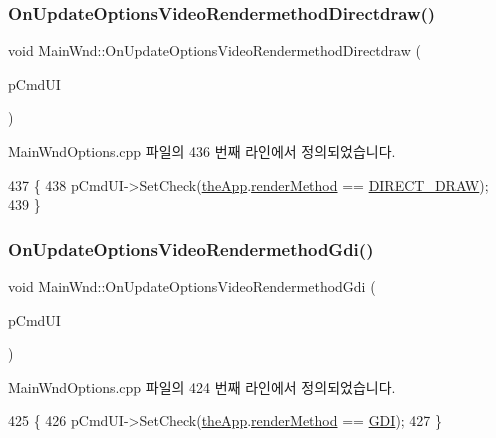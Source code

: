 \subsubsection{\texorpdfstring{On\+Update\+Options\+Video\+Rendermethod\+Directdraw()}{OnUpdateOptionsVideoRendermethodDirectdraw()}}
{\footnotesize\ttfamily void Main\+Wnd\+::\+On\+Update\+Options\+Video\+Rendermethod\+Directdraw (\begin{DoxyParamCaption}\item[{C\+Cmd\+UI $\ast$}]{p\+Cmd\+UI }\end{DoxyParamCaption})\hspace{0.3cm}{\ttfamily [protected]}}



Main\+Wnd\+Options.\+cpp 파일의 436 번째 라인에서 정의되었습니다.


\begin{DoxyCode}
437 \{
438   pCmdUI->SetCheck(\mbox{\hyperlink{_v_b_a_8cpp_a8095a9d06b37a7efe3723f3218ad8fb3}{theApp}}.\mbox{\hyperlink{class_v_b_a_ae31026d8986a7658f3aaa46fba9de663}{renderMethod}} == \mbox{\hyperlink{_display_8h_aa50f63b0688d0250e0be64d8401d09a0a6673ac9056900ae119f5b5cb24c5fde6}{DIRECT\_DRAW}});
439 \}
\end{DoxyCode}
\mbox{\label{class_main_wnd_aa9bcdd260d4a368a3ae7b3b988b5adb6}} 
\subsubsection{\texorpdfstring{On\+Update\+Options\+Video\+Rendermethod\+Gdi()}{OnUpdateOptionsVideoRendermethodGdi()}}
{\footnotesize\ttfamily void Main\+Wnd\+::\+On\+Update\+Options\+Video\+Rendermethod\+Gdi (\begin{DoxyParamCaption}\item[{C\+Cmd\+UI $\ast$}]{p\+Cmd\+UI }\end{DoxyParamCaption})\hspace{0.3cm}{\ttfamily [protected]}}



Main\+Wnd\+Options.\+cpp 파일의 424 번째 라인에서 정의되었습니다.


\begin{DoxyCode}
425 \{
426   pCmdUI->SetCheck(\mbox{\hyperlink{_v_b_a_8cpp_a8095a9d06b37a7efe3723f3218ad8fb3}{theApp}}.\mbox{\hyperlink{class_v_b_a_ae31026d8986a7658f3aaa46fba9de663}{renderMethod}} == \mbox{\hyperlink{_display_8h_aa50f63b0688d0250e0be64d8401d09a0ac22b78df6634245907697ac0ba4b87af}{GDI}});
427 \}
\end{DoxyCode}
\mbox{\label{class_main_wnd_a7871df88f8403990a518d441b242a633}} 
